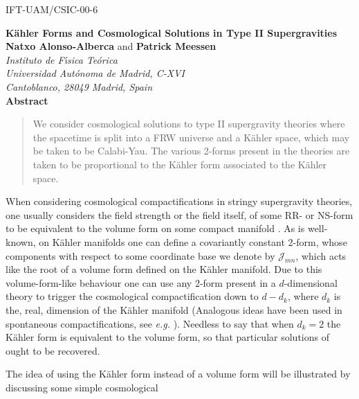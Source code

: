 \documentclass[a4paper,11pt]{article}
\begin{document}
\vspace{-1cm}
\begin{flushright}
IFT-UAM/CSIC-00-6\\
\end{flushright}
\vspace{1cm}
\begin{center}
{\huge\bf
K\"ahler Forms and Cosmological Solutions in Type II Supergravities
}\\[1cm]
%
{\Large {\bf Natxo Alonso-Alberca} and {\bf Patrick Meessen}}\\[.2cm]
{\sl Instituto de F\'{\i}sica Te\'orica\\
Universidad Aut\'onoma de Madrid, C-XVI\\
Cantoblanco, 28049 Madrid, Spain}\\[.5cm]
{\bf Abstract}
\end{center}
\begin{quote}
%
We consider cosmological solutions to type II supergravity theories
where the spacetime is split into a FRW universe and a K\"ahler space,
which may be taken to be Calabi-Yau.
The various 2-forms present in the theories are taken to be proportional 
to the K\"ahler form associated to the K\"ahler space.
%
\end{quote}
When considering cosmological compactifications
in stringy supergravity theories, one usually considers the field strength
or the field itself,
of some RR- or NS-form to be equivalent to the volume form
on some compact manifold \cite{art:Freund,art:LOW,art:LWC}.
As is well-known, on K\"ahler manifolds \cite{art:kaehler}
one can define a covariantly
constant 2-form, whose components with respect to some coordinate base
we denote by $\mathcal{J}_{mn}$, which acts like the root of a volume
form defined on the K\"ahler manifold.
Due to this volume-form-like behaviour
one can use any 2-form present in a $d$-dimensional theory
to trigger the cosmological compactification down to $d-d_{k}$, where 
$d_{k}$ is the, real, dimension of the K\"ahler manifold (Analogous
ideas have been used in spontaneous compactifications, see {\em e.g.}
\cite{art:PvN,art:romans}).
Needless to say that when $d_{k}=2$ the K\"ahler form is equivalent 
to the volume form, so that particular solutions of \cite{art:LOW}
ought to be recovered.
\par
The idea of using the K\"ahler form instead of a volume form
will be illustrated by discussing some simple cosmological 
\end{document}
